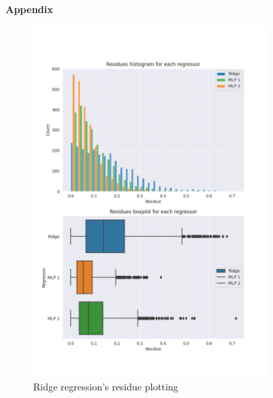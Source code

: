 \documentclass[12pt]{article}
\begin{document}
\pagebreak

\large{\textbf{Appendix}\vskip 0.3cm}



\begin{figure}[H]
  \centering
  \includegraphics[width=0.8\textwidth]{../assets/residues.png}
  \caption{Ridge regression's residue plotting}
  \label{fig:residue-plotting}
\end{figure}
\end{document}
